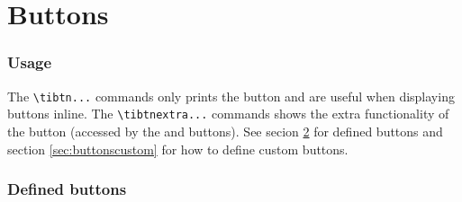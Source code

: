 \documentclass[a4paper,12pt]{article}
\begin{document}
\part{Buttons}

\section{Usage}

The \verb|\tibtn...| commands only prints the button and are useful when
displaying buttons inline. The \verb|\tibtnextra...| commands shows the extra
functionality of the button (accessed by the \tibtnsecond{} and \tibtnalpha{}
buttons). See secion \ref{sec:button} for defined buttons and section
\ref{sec:buttonscustom} for how to define custom buttons.

\section{Defined buttons} \label{sec:button}
\end{document}
